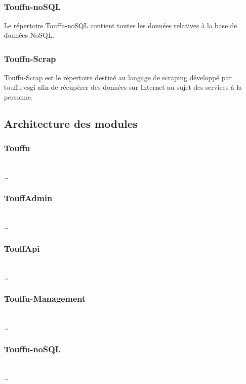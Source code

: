 \documentclass[conference]{IEEEtran}
\newcommand{\bibRef}[1]
{\textsuperscript{\cite{#1}}}
\begin{document}
\subsubsection*{Touffu-noSQL\bibRef{Touffu-noSQL} }

Le répertoire Touffu-noSQL contient toutes les données relatives à la base de données NoSQL.\\

\subsubsection*{Touffu-Scrap\bibRef{Touffu-Scrap} }

Touffu-Scrap est le répertoire destiné au langage de scraping développé par touffu-esgi afin de récupérer des données sur Internet au sujet des services à la personne.\\

\subsection{Architecture des modules}

\subsubsection*{Touffu}
\hfil\\
…\\

\subsubsection*{TouffAdmin}
\hfil\\
…\\

\subsubsection*{TouffApi}
\hfil\\
…\\

\subsubsection*{Touffu-Management}
\hfil\\
…\\

\subsubsection*{Touffu-noSQL}
\hfil\\
…\\
\end{document}
